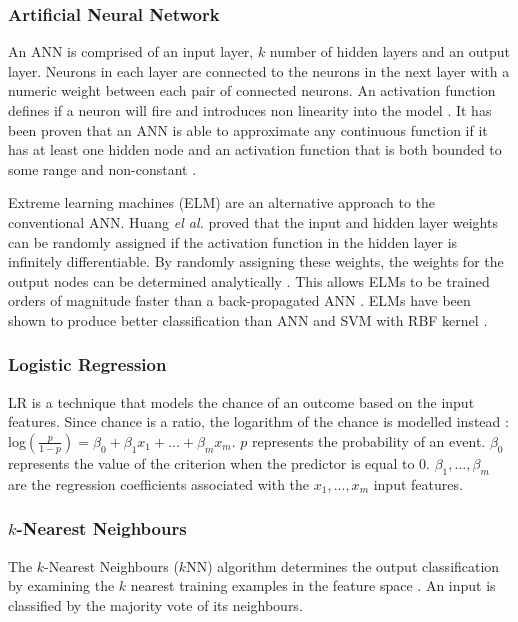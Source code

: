 \documentclass{sig-alternate-05-2015}
\begin{document}
	\subsubsection{Artificial Neural Network}
	An ANN is comprised of an input layer, $k$ number of hidden layers and an output layer. Neurons in each layer are connected to the neurons in the next layer with a numeric weight between each pair of connected neurons. An activation function defines if a neuron will fire and introduces non linearity into the model \cite{Wang2003}. It has been proven that an ANN is able to approximate any continuous function if it has at least one hidden node and an activation function that is both bounded to some range and non-constant \cite{Hornik1991251}.
	
	Extreme learning machines (ELM) are an alternative approach to the conventional ANN. Huang \textit{el al.} \cite{Huang2006489} proved that the input and hidden layer weights can be randomly assigned if the activation function in the hidden layer is infinitely differentiable. By randomly assigning these weights, the weights for the output nodes can be determined analytically \cite{Huang2006489}. This allows ELMs to be trained orders of magnitude faster than a back-propagated ANN \cite{6035797, Huang2006489}. ELMs have been shown to produce better classification than ANN and SVM with RBF kernel \cite{6035797, Huang2006489}.
	
	\subsubsection{Logistic Regression}
	LR \cite{Mood01022010, doi:10.11613/BM.2014.003} is a technique that models the chance of an outcome based on the input features. Since chance is a ratio, the logarithm of the chance is modelled instead \cite{doi:10.11613/BM.2014.003}:
	log$(\frac{p}{1 - p}) = \beta_0 + \beta_1 x_1 + ... + \beta_m x_m$. $p$ represents the probability of an event. $\beta_0$ represents the value of the criterion when the predictor is equal to 0. $\beta_1, ..., \beta_m$ are the regression coefficients associated with the $x_1, ..., x_m$ input features.
	
	\subsubsection{$k$-Nearest Neighbours}
	The $k$-Nearest Neighbours ($k$NN) algorithm determines the output classification by examining the $k$ nearest training examples in the feature space \cite{6313426}. An input is classified by the majority vote of its neighbours.
	
\end{document}

